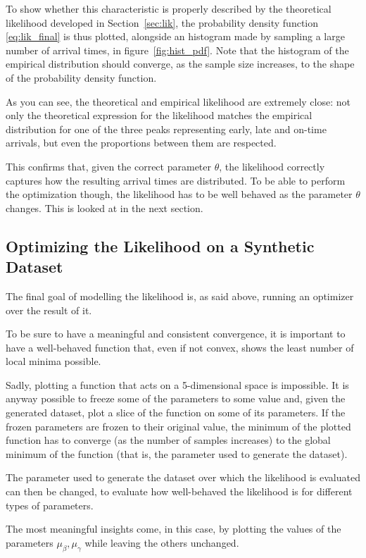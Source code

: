 To show whether this characteristic is properly described by the theoretical likelihood developed in Section~\ref{sec:lik},
the probability density function \eqref{eq:lik_final} is thus plotted,
alongside an histogram made by sampling a large number of arrival times,
in figure~\ref{fig:hist_pdf}.
Note that the histogram of the empirical distribution should converge,
as the sample size increases, to the shape of the probability density function.


As you can see, the theoretical and empirical likelihood are extremely close:
not only the theoretical expression for the likelihood matches the empirical distribution for one of the three peaks representing early, late and on-time arrivals,
but even the proportions between them are respected.

This confirms that, given the correct parameter \(\theta\),
the likelihood correctly captures how the resulting arrival times are distributed.
To be able to perform the optimization though,
the likelihood has to be well behaved as the parameter \(\theta\) changes.
This is looked at in the next section.

\subsection{Optimizing the Likelihood on a Synthetic Dataset}

The final goal of modelling the likelihood is, as said above,
running an optimizer over the result of it.

To be sure to have a meaningful and consistent convergence,
it is important to have a well-behaved function that,
even if not convex, shows the least number of local minima possible.

Sadly, plotting a function that acts on a 5-dimensional space is impossible.
It is anyway possible to freeze some of the parameters to some value and,
given the generated dataset, plot a slice of the function on some of its parameters.
If the frozen parameters are frozen to their original value,
the minimum of the plotted function has to converge (as the number of samples increases)
to the global minimum of the function (that is, the parameter used to generate the dataset).

The parameter used to generate the dataset over which the likelihood is evaluated can then be changed,
to evaluate how well-behaved the likelihood is for different types of parameters.

The most meaningful insights come, in this case, by plotting the values of the parameters \(\mu_\beta, \mu_\gamma\) while leaving the others unchanged.

